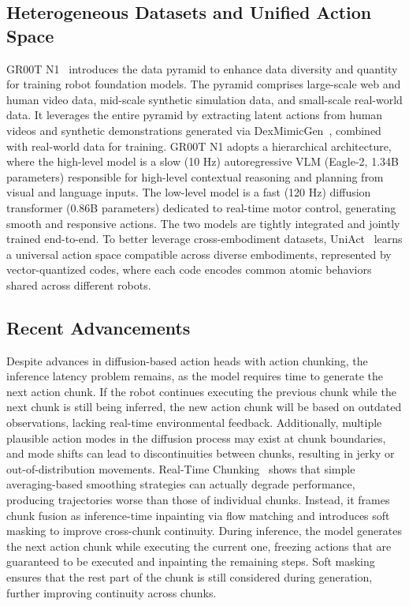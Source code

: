 \documentclass[10pt, a4paper, logo, copyright]{googledeepmind} %
\begin{document}
\subsection{Heterogeneous Datasets and Unified Action Space}
GR00T N1~\cite{nvidia2025gr00tn1openfoundation} introduces the data pyramid to enhance data diversity and quantity for training robot foundation models. The pyramid comprises large-scale web and human video data, mid-scale synthetic simulation data, and small-scale real-world data. It leverages the entire pyramid by extracting latent actions from human videos and synthetic demonstrations generated via DexMimicGen~\cite{jiang2024dexmimicgen}, combined with real-world data for training. 
GR00T N1 adopts a hierarchical architecture, where the high-level model is a slow (10 Hz) autoregressive VLM (Eagle-2, 1.34B parameters) responsible for high-level contextual reasoning and planning from visual and language inputs. The low-level model is a fast (120 Hz) diffusion transformer (0.86B parameters) dedicated to real-time motor control, generating smooth and responsive actions. The two models are tightly integrated and jointly trained end-to-end. 
To better leverage cross-embodiment datasets, UniAct~\cite{UniAct} learns a universal action space compatible across diverse embodiments, represented by vector-quantized codes, where each code encodes common atomic behaviors shared across different robots.

\subsection{Recent Advancements}
Despite advances in diffusion-based action heads with action chunking, the inference latency problem remains, as the model requires time to generate the next action chunk. 
If the robot continues executing the previous chunk while the next chunk is still being inferred, the new action chunk will be based on outdated observations, lacking real-time environmental feedback. Additionally, multiple plausible action modes in the diffusion process may exist at chunk boundaries, and mode shifts can lead to discontinuities between chunks, resulting in jerky or out-of-distribution movements.
Real-Time Chunking~\cite{black2025real} shows that simple averaging-based smoothing strategies can actually degrade performance, producing trajectories worse than those of individual chunks. Instead, it frames chunk fusion as inference-time inpainting via flow matching and introduces soft masking to improve cross-chunk continuity. During inference, the model generates the next action chunk while executing the current one, freezing actions that are guaranteed to be executed and inpainting the remaining steps. Soft masking ensures that the rest part of the chunk is still considered during generation, further improving continuity across chunks.
\end{document}
